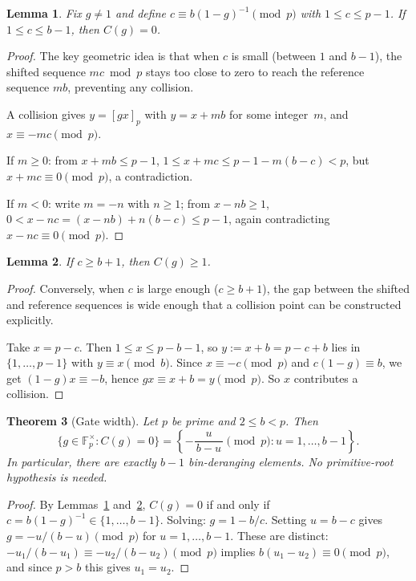\documentclass[12pt]{amsart}
\newtheorem{theorem}{Theorem}
\newtheorem{lemma}[theorem]{Lemma}
\theoremstyle{definition}
\theoremstyle{remark}
\begin{document}
\begin{lemma}\label{lem:no-collision}
Fix $g \ne 1$ and define $c \equiv b(1{-}g)^{-1} \pmod{p}$ with
$1 \le c \le p{-}1$. If $1 \le c \le b{-}1$, then $C(g) = 0$.
\end{lemma}

\begin{proof}
The key geometric idea is that when $c$ is small (between $1$ and
$b-1$), the shifted sequence $mc \bmod p$ stays too close to zero
to reach the reference sequence $mb$, preventing any collision.

A collision gives $y = [gx]_p$ with $y = x + mb$ for some
integer~$m$, and $x \equiv -mc \pmod{p}$.

If $m \ge 0$: from $x + mb \le p{-}1$,
$1 \le x + mc \le p{-}1{-}m(b{-}c) < p$, but $x + mc \equiv 0
\pmod{p}$, a contradiction.

If $m < 0$: write $m = -n$ with $n \ge 1$; from $x - nb \ge 1$,
$0 < x - nc = (x{-}nb) + n(b{-}c) \le p{-}1$,
again contradicting $x - nc \equiv 0 \pmod{p}$.
\end{proof}

\begin{lemma}\label{lem:collision-exists}
If $c \ge b + 1$, then $C(g) \ge 1$.
\end{lemma}

\begin{proof}
Conversely, when $c$ is large enough ($c \ge b+1$), the gap between
the shifted and reference sequences is wide enough that a collision
point can be constructed explicitly.

Take $x = p - c$. Then $1 \le x \le p{-}b{-}1$, so
$y := x + b = p - c + b$ lies in $\{1, \ldots, p{-}1\}$ with
$y \equiv x \pmod{b}$. Since $x \equiv -c \pmod{p}$ and
$c(1{-}g) \equiv b$, we get $(1{-}g)x \equiv -b$, hence
$gx \equiv x + b = y \pmod{p}$. So $x$ contributes a collision.
\end{proof}

\begin{theorem}[Gate width]\label{thm:gate-width}
Let $p$ be prime and $2 \le b < p$. Then
\[
\{g \in \mathbb{F}_p^{\times} : C(g) = 0\}
= \left\{-\frac{u}{\,b - u\,} \pmod{p} :
u = 1, \ldots, b{-}1\right\}.
\]
In particular, there are exactly $b - 1$ bin-deranging elements.
No primitive-root hypothesis is needed.
\end{theorem}

\begin{proof}
By Lemmas~\ref{lem:no-collision} and~\ref{lem:collision-exists},
$C(g) = 0$ if and only if $c = b(1{-}g)^{-1} \in \{1, \ldots,
b{-}1\}$. Solving: $g = 1 - b/c$. Setting $u = b - c$ gives
$g = -u/(b{-}u) \pmod{p}$ for $u = 1, \ldots, b{-}1$. These
are distinct: $-u_1/(b{-}u_1) \equiv -u_2/(b{-}u_2) \pmod{p}$
implies $b(u_1 - u_2) \equiv 0 \pmod{p}$, and since $p > b$
this gives $u_1 = u_2$.
\end{proof}
\end{document}
